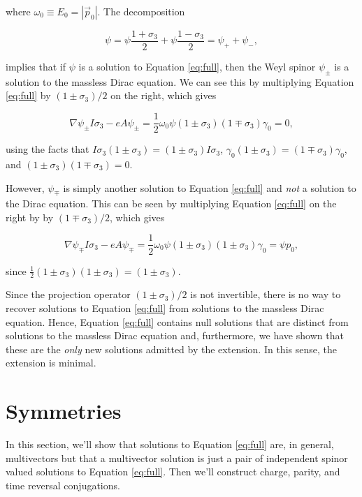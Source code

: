 \documentclass[twocolumn]{article}
\begin{document}
  where $\omega_0 \equiv E_0 = |\vec p_0|$. The decomposition

  \begin{equation}
    \psi = \psi \frac{1 + \sigma_3}{2} + \psi \frac{1 - \sigma_3}{2} = \psi_+ + \psi_-,
  \end{equation}

  implies that if $\psi$ is a solution to Equation \ref{eq:full}, then the Weyl spinor $\psi_\pm$ is a solution to the massless Dirac equation. We can see this by multiplying Equation \ref{eq:full} by $(1 \pm \sigma_3)/2$ on the right, which gives

  \begin{equation}
    \nabla \psi_\pm I \sigma_3 - e A \psi_\pm = \frac{1}{2} \omega_0 \psi (1 \pm \sigma_3)(1 \mp \sigma_3) \gamma_0 = 0,
  \end{equation}

  using the facts that $I \sigma_3 (1 \pm \sigma_3) = (1 \pm \sigma_3) I \sigma_3$, $\gamma_0 (1 \pm \sigma_3) = (1 \mp \sigma_3)\gamma_0$, and $(1 \pm \sigma_3) (1 \mp \sigma_3) = 0$.

  However, $\psi_\mp$ is simply another solution to Equation \ref{eq:full} and \emph{not} a solution to the Dirac equation. This can be seen by multiplying Equation \ref{eq:full} on the right by by $(1 \mp \sigma_3)/2$, which gives

  \begin{equation}
    \nabla \psi_\mp I \sigma_3 - e A \psi_\mp = \frac{1}{2} \omega_0 \psi(1 \pm \sigma_3)(1 \pm \sigma_3) \gamma_0 = \psi p_0,
  \end{equation}

  since $\frac{1}{2}(1 \pm \sigma_3)(1 \pm \sigma_3) = (1 \pm \sigma_3)$.

  Since the projection operator $(1 \pm \sigma_3)/2$ is not invertible, there is no way to recover solutions to Equation \ref{eq:full} from solutions to the massless Dirac equation. Hence, Equation \ref{eq:full} contains null solutions that are distinct from solutions to the massless Dirac equation and, furthermore, we have shown that these are the \emph{only} new solutions admitted by the extension. In this sense, the extension is minimal.

  \section{Symmetries} \label{symmetries}

  In this section, we'll show that solutions to Equation \ref{eq:full} are, in general, multivectors but that a multivector solution is just a pair of independent spinor valued solutions to Equation \ref{eq:full}. Then we'll construct charge, parity, and time reversal conjugations.
\end{document}
